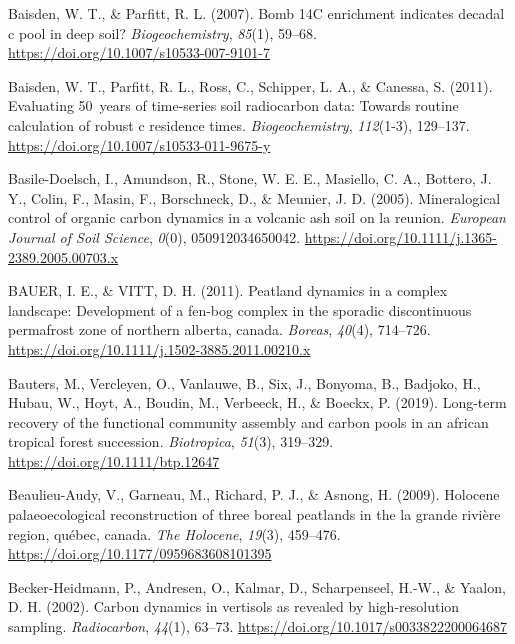 \documentclass[]{article}
\begin{document}
\leavevmode\hypertarget{ref-Baisden_2007}{}%
Baisden, W. T., \& Parfitt, R. L. (2007). Bomb 14C enrichment indicates
decadal c pool in deep soil? \emph{Biogeochemistry}, \emph{85}(1),
59--68. \url{https://doi.org/10.1007/s10533-007-9101-7}

\leavevmode\hypertarget{ref-Baisden_2011}{}%
Baisden, W. T., Parfitt, R. L., Ross, C., Schipper, L. A., \& Canessa,
S. (2011). Evaluating 50~years of time-series soil radiocarbon data:
Towards routine calculation of robust c residence times.
\emph{Biogeochemistry}, \emph{112}(1-3), 129--137.
\url{https://doi.org/10.1007/s10533-011-9675-y}

\leavevmode\hypertarget{ref-Basile_Doelsch_2005}{}%
Basile-Doelsch, I., Amundson, R., Stone, W. E. E., Masiello, C. A.,
Bottero, J. Y., Colin, F., Masin, F., Borschneck, D., \& Meunier, J. D.
(2005). Mineralogical control of organic carbon dynamics in a volcanic
ash soil on la reunion. \emph{European Journal of Soil Science},
\emph{0}(0), 050912034650042.
\url{https://doi.org/10.1111/j.1365-2389.2005.00703.x}

\leavevmode\hypertarget{ref-BAUER_2011}{}%
BAUER, I. E., \& VITT, D. H. (2011). Peatland dynamics in a complex
landscape: Development of a fen-bog complex in the sporadic
discontinuous permafrost zone of northern alberta, canada.
\emph{Boreas}, \emph{40}(4), 714--726.
\url{https://doi.org/10.1111/j.1502-3885.2011.00210.x}

\leavevmode\hypertarget{ref-Bauters_2019}{}%
Bauters, M., Vercleyen, O., Vanlauwe, B., Six, J., Bonyoma, B., Badjoko,
H., Hubau, W., Hoyt, A., Boudin, M., Verbeeck, H., \& Boeckx, P. (2019).
Long-term recovery of the functional community assembly and carbon pools
in an african tropical forest succession. \emph{Biotropica},
\emph{51}(3), 319--329. \url{https://doi.org/10.1111/btp.12647}

\leavevmode\hypertarget{ref-Beaulieu_Audy_2009}{}%
Beaulieu-Audy, V., Garneau, M., Richard, P. J., \& Asnong, H. (2009).
Holocene palaeoecological reconstruction of three boreal peatlands in
the la grande rivière region, québec, canada. \emph{The Holocene},
\emph{19}(3), 459--476. \url{https://doi.org/10.1177/0959683608101395}

\leavevmode\hypertarget{ref-Becker_Heidmann_2002}{}%
Becker-Heidmann, P., Andresen, O., Kalmar, D., Scharpenseel, H.-W., \&
Yaalon, D. H. (2002). Carbon dynamics in vertisols as revealed by
high-resolution sampling. \emph{Radiocarbon}, \emph{44}(1), 63--73.
\url{https://doi.org/10.1017/s0033822200064687}
\end{document}

